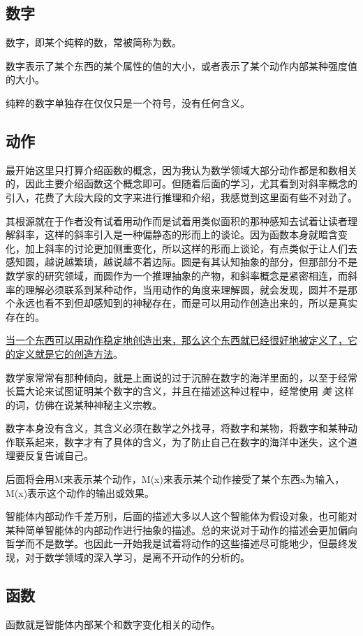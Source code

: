 \documentclass[12pt,oneside]{book}
\begin{document}
\subsection{数字}
数字，即某个纯粹的数，常被简称为数。

数字表示了某个东西的某个属性的值的大小，或者表示了某个动作内部某种强度值的大小。

纯粹的数字单独存在仅仅只是一个符号，没有任何含义。


\subsection{动作}
最开始这里只打算介绍函数的概念，因为我认为数学领域大部分动作都是和数相关的，因此主要介绍函数这个概念即可。但随着后面的学习，尤其看到\cite{烧掉数学书}对斜率概念的引入，花费了大段大段的文字来进行推理和介绍，我感觉到这里面有些不对劲了。

其根源就在于\cite{烧掉数学书}作者没有试着用动作而是试着用类似面积的那种感知去试着让读者理解斜率，这样的斜率引入是一种偏静态的形而上的谈论。因为函数本身就暗含变化，加上斜率的讨论更加侧重变化，所以这样的形而上谈论，有点类似于让人们去感知圆，越说越繁琐，越说越不着边际。圆是有其认知抽象的部分，但那部分不是数学家的研究领域，而圆作为一个推理抽象的产物，和斜率概念是紧密相连，而斜率的理解必须联系到某种动作，当用动作的角度来理解圆，就会发现，圆并不是那个永远也看不到但却感知到的神秘存在，而是可以用动作创造出来的，所以是真实存在的。

\uline{当一个东西可以用动作稳定地创造出来，那么这个东西就已经很好地被定义了，它的定义就是它的创造方法}。

数学家常常有那种倾向，就是上面说的过于沉醉在数字的海洋里面的，以至于经常长篇大论来试图证明某个数字的含义，并且在描述这种过程中，经常使用 \textit{美} 这样的词，仿佛在说某种神秘主义宗教。

数字本身没有含义，其含义必须在数学之外找寻，将数字和某物，将数字和某种动作联系起来，数字才有了具体的含义，为了防止自己在数字的海洋中迷失，这个道理要反复告诫自己。

后面将会用M来表示某个动作，M(x)来表示某个动作接受了某个东西x为输入，M(x)表示这个动作的输出或效果。

智能体内部动作千差万别，后面的描述大多以人这个智能体为假设对象，也可能对某种简单智能体的内部动作进行抽象的描述。总的来说对于动作的描述会更加偏向哲学而不是数学。也因此一开始我是试着将动作的这些描述尽可能地少，但最终发现，对于数学领域的深入学习，是离不开动作的分析的。


\subsection{函数}
函数就是智能体内部某个和数字变化相关的动作。
\end{document}
